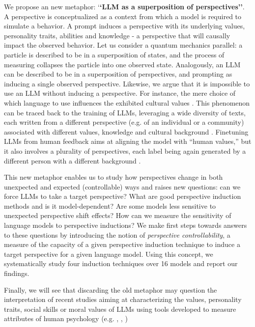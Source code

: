 We propose an new metaphor: `\textbf{`LLM as a superposition of perspectives''}. A perspective is conceptualized as a context from which a model is required to simulate a behavior. A prompt induces a perspective with its underlying values, personality traits, abilities and knowledge - a perspective that will causally impact the observed behavior. Let us consider a quantum mechanics parallel: a particle is described to be in a superposition of states, and the process of measuring collapses the particle into one observed state. Analogously, an LLM can be described to be in a superposition of perspectives, and prompting as inducing a single observed perspective. Likewise, we argue that it is impossible to use an LLM without inducing a perspective. For instance, the mere choice of which language to use influences the exhibited cultural values \citep{Arora2022-ge}. This phenomenon can be traced back to the training of LLMs, leveraging a wide diversity of texts, each written from a different perspective (e.g. of an individual or a community) associated with different values, knowledge and cultural background \citep{Arora2022-ge,hershcovich2022challenges}. Finetuning LLMs from human feedback \citep{rlhf, instructgpt} aims at aligning the model with ``human values,'' but it also involves a plurality of perspectives, each label being again generated by a different person with a different background \citep{rame2023rewarded}.

This new metaphor enables us to study how perspectives change in both unexpected and expected (controllable) ways and raises new questions: can we force LLMs to take a target perspective? What are good perspective induction methods and is it model-dependent? Are some models less sensitive to unexpected perspective shift effects? How can we measure the sensitivity of language models to perspective inductions? We make first steps towards answers to these questions by introducing the notion of \textit{perspective controllability}, a measure of the capacity of a given perspective induction technique to induce a target perspective for a given language model. Using this concept, we systematically study four induction techniques over 16 models and report our findings. 

Finally, we will see that discarding the old metaphor may question the interpretation of recent studies aiming at characterizing the values, personality traits, social skills or moral values of LLMs using tools developed to measure attributes of human psychology (e.g. \citet{Miotto2022-jq}, \citet{stevenson2022putting}, \citet{li2022gpt}) 

